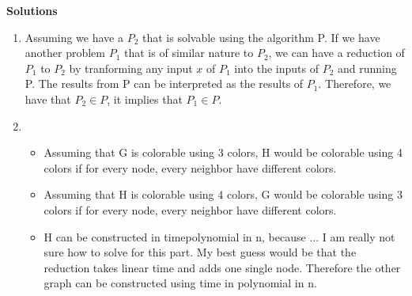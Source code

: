 \documentclass[9pt]{article}
\begin{document}
\textbf{Solutions}
\begin{enumerate}
  \item Assuming we have a $P_2$ that is solvable using the algorithm P. If we have another problem $P_1$ that is of similar nature to $P_2$, we can have a reduction of $P_1$ to $P_2$ by tranforming any input $x$ of $P_1$ into the inputs of $P_2$ and running P. The results from P can be interpreted as the results of $P_1$.
  Therefore, we have that $P_2 \in P$, it implies that $P_1 \in P$.

  \item \phantom{.}
  \begin{itemize}
    \item Assuming that G is colorable using 3 colors, H would be colorable using 4 colors if for every node, every neighbor have different colors. 
    \item Assuming that H is colorable using 4 colors, G would be colorable using 3 colors if for every node, every neighbor have different colors. 
    \item H can  be  constructed  in  timepolynomial in n, because ... I am really not sure how to solve for this part. My best guess would be that the reduction takes linear time and adds one single node. Therefore the other graph can be constructed using time in polynomial in n.
  \end{itemize}

\end{enumerate}
\end{document}
